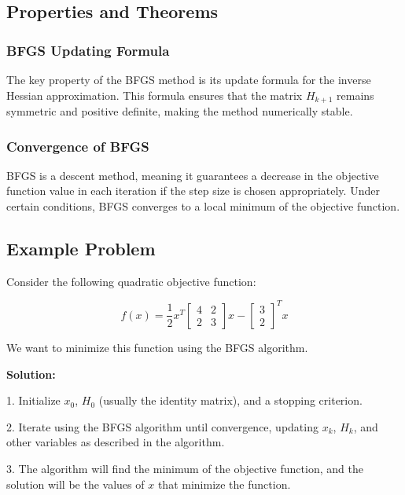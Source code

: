 \documentclass[a4paper]{article}
\begin{document}
\subsection{Properties and Theorems}

\subsubsection{BFGS Updating Formula}

The key property of the BFGS method is its update formula for the inverse Hessian approximation. This formula ensures that the matrix $H_{k+1}$ remains symmetric and positive definite, making the method numerically stable.

\subsubsection{Convergence of BFGS}

BFGS is a descent method, meaning it guarantees a decrease in the objective function value in each iteration if the step size is chosen appropriately. Under certain conditions, BFGS converges to a local minimum of the objective function.

\subsection{Example Problem}

Consider the following quadratic objective function:

\[
f(x) = \frac{1}{2}x^T
\begin{bmatrix}
4 & 2 \\
2 & 3
\end{bmatrix}
x - \begin{bmatrix}
3 \\
2
\end{bmatrix}^Tx
\]

We want to minimize this function using the BFGS algorithm.

\textbf{Solution:}

1. Initialize $x_0$, $H_0$ (usually the identity matrix), and a stopping criterion.

2. Iterate using the BFGS algorithm until convergence, updating $x_k$, $H_k$, and other variables as described in the algorithm.

3. The algorithm will find the minimum of the objective function, and the solution will be the values of $x$ that minimize the function.
\end{document}
